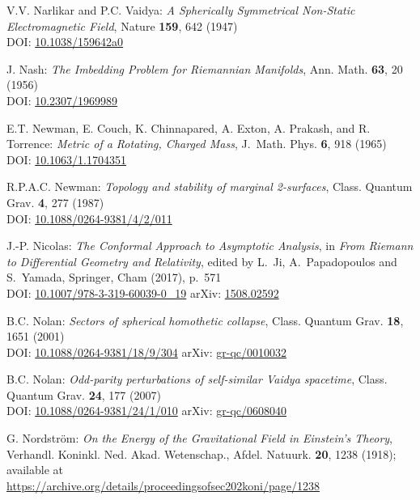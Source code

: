 \begin{thebibliography}{123}
V.V. Narlikar and P.C. Vaidya:
{\em A Spherically Symmetrical Non-Static Electromagnetic Field},
Nature {\bf 159}, 642 (1947) \\
DOI: \href{https://doi.org/10.1038/159642a0}{10.1038/159642a0}

J. Nash:
{\em The Imbedding Problem for Riemannian Manifolds},
Ann. Math. {\bf 63}, 20 (1956)\\
DOI: \href{https://doi.org/10.2307/1969989}{10.2307/1969989}

E.T. Newman, E. Couch, K. Chinnapared, A. Exton, A. Prakash, and R. Torrence:
{\em Metric of a Rotating, Charged Mass},
J.~Math. Phys. {\bf 6}, 918 (1965)\\
DOI: \href{https://doi.org/10.1063/1.1704351}{10.1063/1.1704351}

R.P.A.C. Newman:
{\em Topology and stability of marginal 2-surfaces},
Class. Quantum Grav. {\bf 4}, 277 (1987)\\
DOI: \href{https://doi.org/10.1088/0264-9381/4/2/011}{10.1088/0264-9381/4/2/011}

J.-P. Nicolas:
{\em The Conformal Approach to Asymptotic Analysis},
in {\em From Riemann to Differential Geometry and Relativity},
edited by L.~Ji, A.~Papadopoulos and S.~Yamada, Springer, Cham (2017), p.~571\\
DOI: \href{https://doi.org/10.1007/978-3-319-60039-0_19}{10.1007/978-3-319-60039-0\_19}\hfill
arXiv: \href{https://arxiv.org/abs/1508.02592}{1508.02592}

B.C. Nolan:
{\em Sectors of spherical homothetic collapse},
Class. Quantum Grav. {\bf 18}, 1651 (2001)\\
DOI: \href{https://doi.org/10.1088/0264-9381/18/9/304}{10.1088/0264-9381/18/9/304}\hfill
arXiv: \href{https://arxiv.org/abs/gr-qc/0010032}{gr-qc/0010032}

B.C. Nolan:
{\em Odd-parity perturbations of self-similar Vaidya spacetime},
Class. Quantum Grav. {\bf 24}, 177 (2007)\\
DOI: \href{https://doi.org/10.1088/0264-9381/24/1/010}{10.1088/0264-9381/24/1/010}\hfill
arXiv: \href{https://arxiv.org/abs/gr-qc/0608040}{gr-qc/0608040}

G. Nordström:
{\em On the Energy of the Gravitational Field in Einstein's Theory},
Verhandl. Koninkl. Ned. Akad. Wetenschap., Afdel. Natuurk. {\bf 20}, 1238 (1918);
available at\\
\url{https://archive.org/details/proceedingsofsec202koni/page/1238}


\end{thebibliography}
